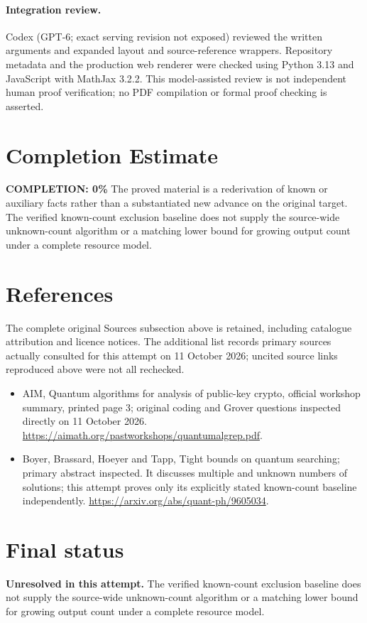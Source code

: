 \documentclass[11pt]{article}
\begin{document}
\paragraph{Integration review.} Codex (GPT-6; exact serving revision not exposed) reviewed the written arguments and expanded layout and source-reference wrappers. Repository metadata and the production web renderer were checked using Python 3.13 and JavaScript with MathJax 3.2.2. This model-assisted review is not independent human proof verification; no PDF compilation or formal proof checking is asserted.

\section{Completion Estimate}
\noindent\textbf{COMPLETION: 0\%}
The proved material is a rederivation of known or auxiliary facts rather than a substantiated new advance on the original target. The verified known-count exclusion baseline does not supply the source-wide unknown-count algorithm or a matching lower bound for growing output count under a complete resource model.
\section{References}
The complete original Sources subsection above is retained, including catalogue attribution and licence notices. The additional list records primary sources actually consulted for this attempt on 11 October 2026; uncited source links reproduced above were not all rechecked.
\begin{itemize}
\item AIM, Quantum algorithms for analysis of public-key crypto, official workshop summary, printed page 3; original coding and Grover questions inspected directly on 11 October 2026. \url{https://aimath.org/pastworkshops/quantumalgrep.pdf}.
\item Boyer, Brassard, Hoeyer and Tapp, Tight bounds on quantum searching; primary abstract inspected. It discusses multiple and unknown numbers of solutions; this attempt proves only its explicitly stated known-count baseline independently. \url{https://arxiv.org/abs/quant-ph/9605034}.
\end{itemize}
\section{Final status}
\textbf{Unresolved in this attempt.} The verified known-count exclusion baseline does not supply the source-wide unknown-count algorithm or a matching lower bound for growing output count under a complete resource model.
\end{document}
